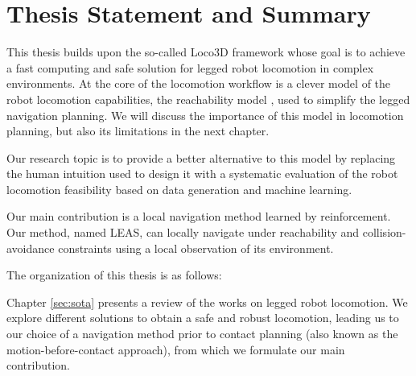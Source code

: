 \section{Thesis Statement and Summary}


This thesis builds upon the so-called Loco3D framework \cite{loco3d, thesis_steve} whose goal is to achieve a fast computing and safe solution for legged robot locomotion in complex environments.
At the core of the locomotion workflow is a clever model of the robot locomotion capabilities, the reachability model \cite{RB-PRM}, used to simplify the legged navigation planning. We will discuss the importance of this model in locomotion planning, but also its limitations in the next chapter.

Our research topic is to provide a better alternative to this model by replacing the human intuition used to design it with a systematic evaluation of the robot locomotion feasibility based on data generation and machine learning.

Our main contribution is a local navigation method learned by reinforcement. 
Our method, named LEAS, can locally navigate under reachability and collision-avoidance constraints using a local observation of its environment.

\hfill \break

The organization of this thesis is as follows:

Chapter \ref{sec:sota} presents a review of the works on legged robot locomotion. 
We explore different solutions to obtain a safe and robust locomotion, leading us to our choice of a navigation method prior to contact planning (also known as the motion-before-contact approach), from which we formulate our main contribution.


